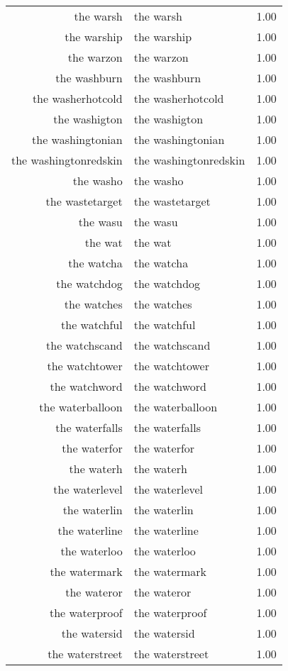 \begin{table}[ht]
\begin{tabular}{rlr}
  the warsh & the warsh & 1.00 \\ 
  the warship & the warship & 1.00 \\ 
  the warzon & the warzon & 1.00 \\ 
  the washburn & the washburn & 1.00 \\ 
  the washerhotcold & the washerhotcold & 1.00 \\ 
  the washigton & the washigton & 1.00 \\ 
  the washingtonian & the washingtonian & 1.00 \\ 
  the washingtonredskin & the washingtonredskin & 1.00 \\ 
  the washo & the washo & 1.00 \\ 
  the wastetarget & the wastetarget & 1.00 \\ 
  the wasu & the wasu & 1.00 \\ 
  the wat & the wat & 1.00 \\ 
  the watcha & the watcha & 1.00 \\ 
  the watchdog & the watchdog & 1.00 \\ 
  the watches & the watches & 1.00 \\ 
  the watchful & the watchful & 1.00 \\ 
  the watchscand & the watchscand & 1.00 \\ 
  the watchtower & the watchtower & 1.00 \\ 
  the watchword & the watchword & 1.00 \\ 
  the waterballoon & the waterballoon & 1.00 \\ 
  the waterfalls & the waterfalls & 1.00 \\ 
  the waterfor & the waterfor & 1.00 \\ 
  the waterh & the waterh & 1.00 \\ 
  the waterlevel & the waterlevel & 1.00 \\ 
  the waterlin & the waterlin & 1.00 \\ 
  the waterline & the waterline & 1.00 \\ 
  the waterloo & the waterloo & 1.00 \\ 
  the watermark & the watermark & 1.00 \\ 
  the wateror & the wateror & 1.00 \\ 
  the waterproof & the waterproof & 1.00 \\ 
  the watersid & the watersid & 1.00 \\ 
  the waterstreet & the waterstreet & 1.00 \\ 

\end{tabular}
\end{table}
